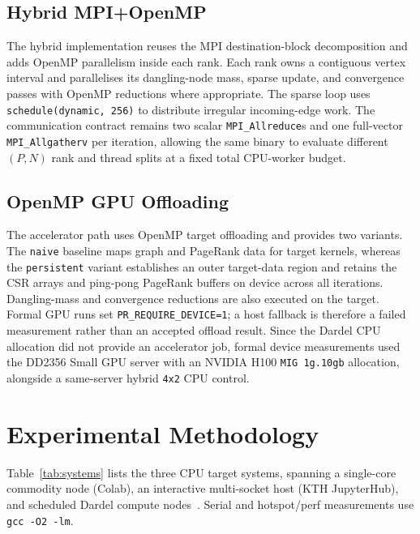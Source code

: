 \documentclass[11pt]{article}
\begin{document}
\subsection{Hybrid MPI+OpenMP}
\label{subsec:wang-hybrid}

The hybrid implementation reuses the MPI destination-block decomposition
and adds OpenMP parallelism inside each rank. Each rank owns a contiguous
vertex interval and parallelises its dangling-node mass, sparse update,
and convergence passes with OpenMP reductions where appropriate. The
sparse loop uses \texttt{schedule(dynamic, 256)} to distribute irregular
incoming-edge work. The communication contract remains two scalar
\texttt{MPI\_Allreduce}s and one full-vector \texttt{MPI\_Allgatherv} per
iteration, allowing the same binary to evaluate different $(P,N)$ rank
and thread splits at a fixed total CPU-worker budget.

\subsection{OpenMP GPU Offloading}
\label{subsec:wang-gpu}

The accelerator path uses OpenMP target offloading and provides two
variants. The \texttt{naive} baseline maps graph and PageRank data for
target kernels, whereas the \texttt{persistent} variant establishes an
outer target-data region and retains the CSR arrays and ping-pong
PageRank buffers on device across all iterations. Dangling-mass and
convergence reductions are also executed on the target. Formal GPU runs
set \texttt{PR\_REQUIRE\_DEVICE=1}; a host fallback is therefore a
failed measurement rather than an accepted offload result. Since the
Dardel CPU allocation did not provide an accelerator job, formal device
measurements used the DD2356 Small GPU server with an NVIDIA H100
\texttt{MIG 1g.10gb} allocation, alongside a same-server hybrid
\texttt{4x2} CPU control.

\section{Experimental Methodology}
\label{sec:methodology}

Table~\ref{tab:systems} lists the three CPU target systems, spanning a
single-core commodity node (Colab), an interactive multi-socket host
(KTH JupyterHub), and scheduled Dardel compute nodes~\cite{dardel}.
Serial and hotspot/perf measurements use \texttt{gcc -O2 -lm}.
\end{document}
